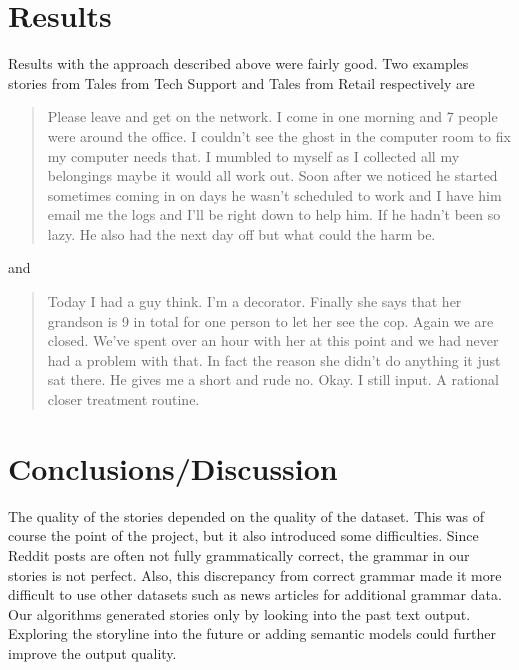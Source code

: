 \documentclass[12pt,a4paper,utf8]{article}
\begin{document}
\section{Results}
Results with the approach described above were fairly good. Two examples stories from Tales from Tech Support and Tales from Retail respectively are

\begin{quotation}
Please leave and get on the network. I come in one morning and 7 people were around the office. I couldn’t see the ghost in the computer room to fix my computer needs that. I mumbled to myself as I collected all my belongings maybe it would all work out. Soon after we noticed he started sometimes coming in on days he wasn't scheduled to work and I have him email me the logs and I'll be right down to help him. If he hadn't been so lazy. He also had the next day off but what could the harm be.
\end{quotation}
and
\begin{quotation}
Today I had a guy think. I'm a decorator. Finally she says that her grandson is 9 in total for one person to let her see the cop. Again we are closed. We've spent over an hour with her at this point and we had never had a problem with that. In fact the reason she didn't do anything it just sat there. He gives me a short and rude no. Okay. I still input. A rational closer treatment routine.
\end{quotation}

\section{Conclusions/Discussion}
The quality of the stories depended on the quality of the dataset. This was of course the point of the project, but it also introduced some difficulties. Since Reddit posts are often not fully grammatically correct, the grammar in our stories is not perfect. Also, this discrepancy from correct grammar made it more difficult to use other datasets such as news articles for additional grammar data. Our algorithms generated stories only by looking into the past text output. Exploring the storyline into the future or adding semantic models could further improve the output quality.

\printbibliography[heading=bibnumbered]
\end{document}
